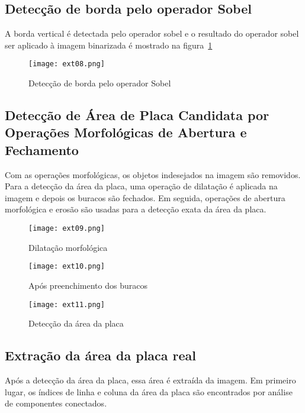 \subsection{Detecção de borda pelo operador Sobel}

A borda vertical é detectada pelo operador sobel e o resultado do operador sobel
ser aplicado à imagem binarizada é mostrado na figura~\ref{fig:ext_edge_detection_sobel}

\begin{figure}[H]
	\centering
	\texttt{[image: ext08.png]}
	\caption{Detecção de borda pelo operador Sobel}
	\label{fig:ext_edge_detection_sobel}
\end{figure}

\subsection{Detecção de Área de Placa Candidata por Operações Morfológicas de Abertura e Fechamento}

Com as operações morfológicas, os objetos indesejados na imagem são removidos.
Para a detecção da área da placa, uma operação de dilatação é aplicada na imagem
e depois os buracos são fechados. Em seguida, operações de abertura morfológica
e erosão são usadas para a detecção exata da área da placa.

\begin{figure}[H]
	\centering
	\texttt{[image: ext09.png]}
	\caption{Dilatação morfológica}
	\label{fig:ext_morphological_dilation}
\end{figure}

\begin{figure}[H]
	\centering
	\texttt{[image: ext10.png]}
	\caption{Após preenchimento dos buracos}
	\label{fig:ext_holes_filled}
\end{figure}

\begin{figure}[H]
	\centering
	\texttt{[image: ext11.png]}
	\caption{Detecção da área da placa}
	\label{fig:ext_plate_area_detection}
\end{figure}

\subsection{Extração da área da placa real}

Após a detecção da área da placa, essa área é extraída da imagem. Em primeiro
lugar, os índices de linha e coluna da área da placa são encontrados por análise
de componentes conectados.

